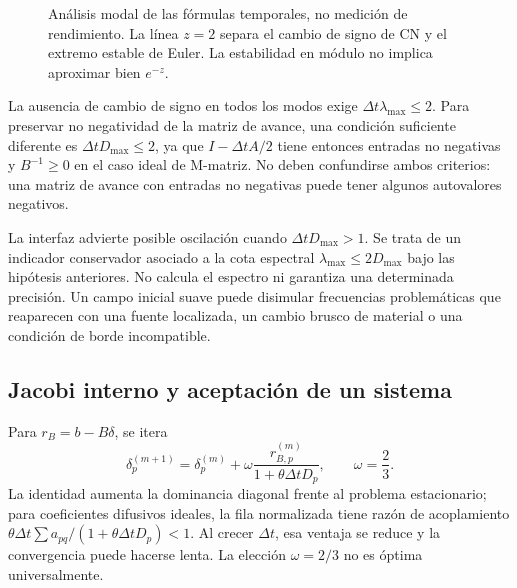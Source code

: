 \documentclass[11pt,a4paper]{article}
\newcommand{\dt}{\Delta t}
\begin{document}
\begin{figure}[htbp]\centering
{}
\caption{Análisis modal de las fórmulas temporales, no medición de rendimiento.
La línea $z=2$ separa el cambio de signo de CN y el extremo estable de Euler.
La estabilidad en módulo no implica aproximar bien $e^{-z}$.}
\label{fig:gain}
\end{figure}

La ausencia de cambio de signo en todos los modos exige
$\dt\lambda_{\max}\le2$. Para preservar no negatividad de la matriz de avance,
una condición suficiente diferente es $\dt D_{\max}\le2$, ya que
$I-\dt A/2$ tiene entonces entradas no negativas y $B^{-1}\ge0$ en el caso
ideal de M-matriz. No deben confundirse ambos criterios: una matriz de avance
con entradas no negativas puede tener algunos autovalores negativos.

La interfaz advierte posible oscilación cuando $\dt D_{\max}>1$. Se trata de
un indicador conservador asociado a la cota espectral
$\lambda_{\max}\le2D_{\max}$ bajo las hipótesis anteriores. No calcula el
espectro ni garantiza una determinada precisión. Un campo inicial suave puede
disimular frecuencias problemáticas que reaparecen con una fuente localizada,
un cambio brusco de material o una condición de borde incompatible.

\subsection{Jacobi interno y aceptación de un sistema}
Para $r_B=b-B\delta$, se itera
\begin{equation}
 \delta_p^{(m+1)}=\delta_p^{(m)}+
 \omega\frac{r_{B,p}^{(m)}}{1+\theta\dt D_p},\qquad \omega=\frac23.
 \label{eq:innerjacobi}
\end{equation}
La identidad aumenta la dominancia diagonal frente al problema estacionario;
para coeficientes difusivos ideales, la fila normalizada tiene razón de
acoplamiento $\theta\dt\sum a_{pq}/(1+\theta\dt D_p)<1$.
Al crecer $\dt$, esa ventaja se reduce y la convergencia puede hacerse lenta.
La elección $\omega=2/3$ no es óptima universalmente.
\end{document}
